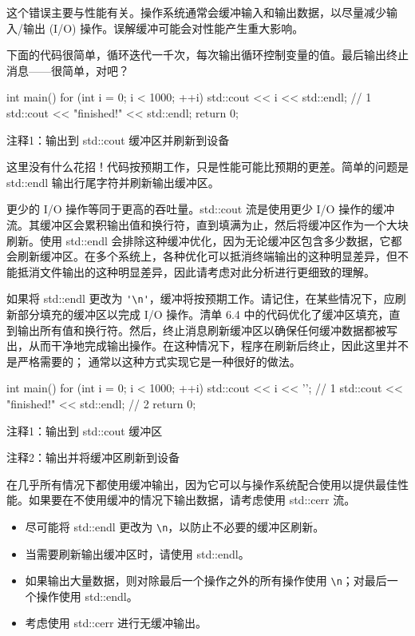 这个错误主要与性能有关。操作系统通常会缓冲输入和输出数据，以尽量减少输入/输出 (I/O) 操作。误解缓冲可能会对性能产生重大影响。


下面的代码很简单，循环迭代一千次，每次输出循环控制变量的值。最后输出终止消息——很简单，对吧？


\begin{cpp}
int main() {
  for (int i = 0; i < 1000; ++i)
    std::cout << i << std::endl; // 1
  std::cout << "finished!" << std::endl;
  return 0;
}
\end{cpp}

{\footnotesize
注释1：输出到 std::cout 缓冲区并刷新到设备
}


这里没有什么花招！代码按预期工作，只是性能可能比预期的更差。简单的问题是 std::endl 输出行尾字符并刷新输出缓冲区。

更少的 I/O 操作等同于更高的吞吐量。std::cout 流是使用更少 I/O 操作的缓冲流。其缓冲区会累积输出值和换行符，直到填满为止，然后将缓冲区作为一个大块刷新。使用 std::endl 会排除这种缓冲优化，因为无论缓冲区包含多少数据，它都会刷新缓冲区。在多个系统上，各种优化可以抵消终端输出的这种明显差异，但不能抵消文件输出的这种明显差异，因此请考虑对此分析进行更细致的理解。


如果将 std::endl 更改为 \verb|'\n'|，缓冲将按预期工作。请记住，在某些情况下，应刷新部分填充的缓冲区以完成 I/O 操作。清单 6.4 中的代码优化了缓冲区填充，直到输出所有值和换行符。然后，终止消息刷新缓冲区以确保任何缓冲数据都被写出，从而干净地完成输出操作。在这种情况下，程序在刷新后终止，因此这里并不是严格需要的； 通常以这种方式实现它是一种很好的做法。


\begin{cpp}
int main() {
  for (int i = 0; i < 1000; ++i)
    std::cout << i << '\n'; // 1
  std::cout << "finished!" << std::endl; // 2
  return 0;
}
\end{cpp}

{\footnotesize
注释1：输出到 std::cout 缓冲区

注释2：输出并将缓冲区刷新到设备
}

在几乎所有情况下都使用缓冲输出，因为它可以与操作系统配合使用以提供最佳性能。如果要在不使用缓冲的情况下输出数据，请考虑使用 std::cerr 流。


\begin{itemize}
\item
尽可能将 std::endl 更改为 \verb|\n|，以防止不必要的缓冲区刷新。

\item
当需要刷新输出缓冲区时，请使用 std::endl。

\item
如果输出大量数据，则对除最后一个操作之外的所有操作使用 \verb|\n|；对最后一个操作使用 std::endl。

\item
考虑使用 std::cerr 进行无缓冲输出。
\end{itemize}






